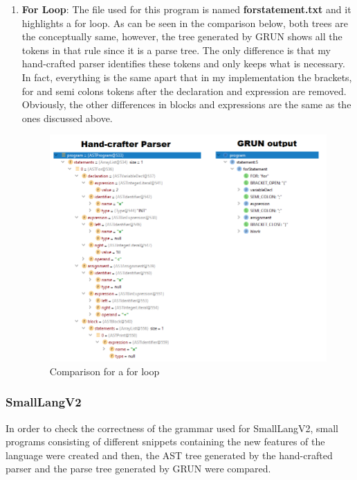 \documentclass{article}
\begin{document}
\begin{enumerate}
					\item \textbf{For Loop}: The file used for this program is named \textbf{forstatement.txt} and it highlights a for loop. As can be seen in the comparison below, both trees are the conceptually same, however, the tree generated by GRUN shows all the tokens in that rule since it is a parse tree. The only difference is that my hand-crafted parser identifies these tokens and only keeps what is necessary.  In fact, everything is the same apart that in my implementation the brackets, for and semi colons tokens after the declaration and expression are removed. Obviously, the other differences in blocks and expressions are the same as the ones discussed above.
						\begin{figure}[H]
					\centering
			 			\includegraphics[width=\textwidth]{comparefor.png}
			  			\caption{Comparison for a for loop}
			  			\label{fig:comparefor}
					\end{figure}
				
					
		\end{enumerate}
		
			\subsubsection{SmallLangV2}
		
		In order to check the correctness of the grammar used for SmallLangV2, small programs consisting of different snippets containing the new features of the language were created and then, the AST tree generated by the hand-crafted parser and the parse tree generated by GRUN were compared.
		
\end{document}

